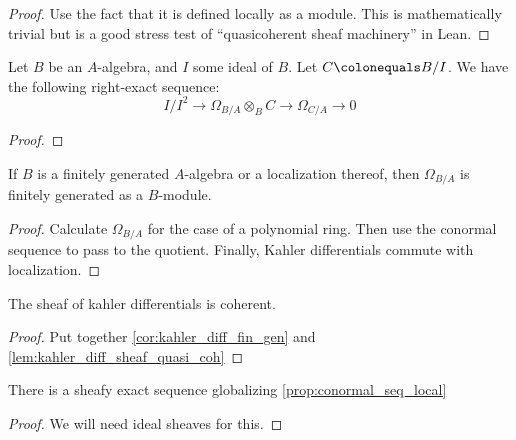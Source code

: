 \begin{proof}
	Use the fact that it is defined locally
	as a module.
	This is mathematically trivial but 
	is a good stress test of 
	``quasicoherent sheaf machinery''
	in Lean.
\end{proof}

\begin{proposition}
  \label{prop:conormal_seq_local}
  Let $B$ be an $A$-algebra, and $I$ some
  ideal of $B$.
  Let $C \colonequals B / I$.
  We have the following right-exact sequence:
  \[
    I / I^2 \to
    \Omega_{B/A} \otimes_B C \to
    \Omega_{C/A} \to 0
  \]
\end{proposition}

\begin{proof}

\end{proof}

\begin{corollary}
  [Hartshorne II.8.5]
  \label{cor:kahler_diff_fin_gen}
  If $B$ is a finitely generated 
  $A$-algebra or a localization thereof,
  then $\Omega_{B/A}$ is finitely generated
  as a $B$-module.
\end{corollary}

\begin{proof}
  Calculate $\Omega_{B/A}$ for the 
  case of a polynomial ring.
  Then use the conormal sequence
  to pass to the quotient.
  Finally, Kahler differentials 
  commute with localization.
\end{proof}


\begin{corollary}
  \label{cor:kahler_diff_sheaf_coh}
  The sheaf of kahler differentials is
  coherent.
\end{corollary}

\begin{proof}
  Put together \ref{cor:kahler_diff_fin_gen}
  and \ref{lem:kahler_diff_sheaf_quasi_coh} 
\end{proof}

\begin{proposition}
  \label{prop:conormal_seq_sheaf}
  There is a sheafy exact sequence globalizing 
  \ref{prop:conormal_seq_local}
\end{proposition}

\begin{proof}
  We will need ideal sheaves for this.
\end{proof}


